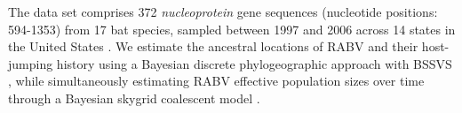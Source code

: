 \documentclass{bioinfo_tracer}
\begin{document}
%
The data set comprises 372 \textit{nucleoprotein} gene sequences (nucleotide positions: 594-1353) from
17 bat species, sampled between 1997 and 2006 across 14 states in the United States \citep{Streicker,Faria2013}.
We estimate the ancestral locations of RABV and their host-jumping history using a Bayesian discrete phylogeographic approach with BSSVS \citep{Lemey2009}, while simultaneously estimating RABV effective population sizes over time through a Bayesian skygrid coalescent model \citep{gill2012improving}.
\end{document}
